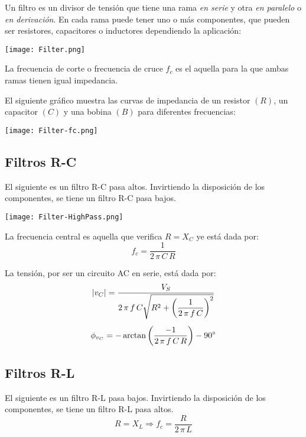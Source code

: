 \documentclass[a5paper,12pt,twoside]{book}
\begin{document}
Un filtro es un divisor de tensión que tiene una rama \emph{en serie} y otra \emph{en paralelo} o \emph{en derivación}. En cada rama puede tener uno o más componentes, que pueden ser resistores, capacitores o inductores dependiendo la aplicación:

\begin{center}
    \texttt{[image: Filter.png]}
\end{center}

La frecuencia de corte o frecuencia de cruce $f_c$ es el aquella para la que ambas ramas tienen igual impedancia.

El siguiente gráfico muestra las curvas de impedancia de un resistor $(R)$, un capacitor $(C)$ y una bobina $(B)$ para diferentes frecuencias:

\begin{center}
    \texttt{[image: Filter-fc.png]}
\end{center}


\subsection*{Filtros R-C}

El siguiente es un filtro R-C pasa altos. Invirtiendo la disposición de los componentes, se tiene un filtro R-C pasa bajos.

\begin{center}
    \texttt{[image: Filter-HighPass.png]}
\end{center}

La frecuencia central es aquella que verifica $R = X_C$ ye está dada por:
\begin{equation*}
    f_c = \frac{1}{2 \, \pi \, C \, R}
\end{equation*}

La tensión, por ser un circuito AC en serie, está dada por:
\begin{gather*}
    {\left| {v_C} \right|} = \frac{V_S}{2 \, \pi \, f \, C \sqrt{R^2 + \left(\dfrac{1}{2 \, \pi \, f \, C}\right)^2}}
    \\[1ex]
    \phi_{v_C} = - \arctan{\left(\dfrac{-1}{2 \, \pi \, f \, C \, R}\right)} - \ang{90}
\end{gather*}


\subsection*{Filtros R-L}

El siguiente es un filtro R-L pasa bajos. Invirtiendo la disposición de los componentes, se tiene un filtro R-L pasa altos.
\begin{equation*}
    R = X_L \Rightarrow f_c = \frac{R}{2 \, \pi \, L}
\end{equation*}
\end{document}
